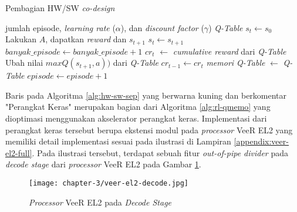 \begin{algorithm}
	\makeatletter
	\renewcommand{\ALG@name}{Algoritma}
	\makeatother
	\caption{Pembagian HW/SW \textit{co-design}}\label{alg:hw-sw-sep}
	\renewcommand{\algorithmicrequire}{\textbf{Masukan:}}
	\renewcommand{\algorithmicensure}{\textbf{Keluaran:}}
	\begin{algorithmic}[1]
		\Require jumlah episode, \textit{learning rate} ($\alpha$), dan \textit{discount factor} ($\gamma$)
		\Ensure \textit{Q-Table}
		\State {}
		\State {}
		\State $s_{t} \gets s_0$
		\State {}
		\State Lakukan $A$, dapatkan \textit{reward} dan $s_{t+1}$
		\State {}
		\State {}
		\State $s_t \gets s_{t+1}$
		\EndWhile
		\State $banyak\_episode \gets banyak\_episode + 1$
		\State $cr_t$ $\gets$ \textit{cumulative reward} dari \textit{Q-Table}
		\State Ubah nilai $maxQ(s_{t+1},a))$ dari \textit{Q-Table}
		\EndIf
		\State $cr_{t-1} \gets cr_t$
		\State \textit{memori Q-Table} $\gets$ \textit{Q-Table}
		\State $episode \gets episode + 1$
		\EndWhile
	\end{algorithmic}
\end{algorithm}

Baris pada Algoritma \ref{alg:hw-sw-sep} yang berwarna kuning dan berkomentar "Perangkat Keras" merupakan bagian dari Algoritma \ref{alg:rl-qmemo} yang dioptimasi menggunakan akselerator perangkat keras. Implementasi dari perangkat keras tersebut berupa ekstensi modul pada \textit{processor} VeeR EL2 yang memiliki detail implementasi sesuai pada ilustrasi di Lampiran \ref{appendix:veer-el2-full}. Pada ilustrasi tersebut, terdapat sebuah fitur \textit{out-of-pipe divider} pada \textit{decode stage} dari \textit{processor} VeeR EL2 pada Gambar \ref{fig:veer-el2-decode}.

\begin{figure}[H]
	\centering
	\texttt{[image: chapter-3/veer-el2-decode.jpg]}
	\caption{\textit{Processor} VeeR EL2 pada \textit{Decode Stage}}
	\label{fig:veer-el2-decode}
\end{figure}

